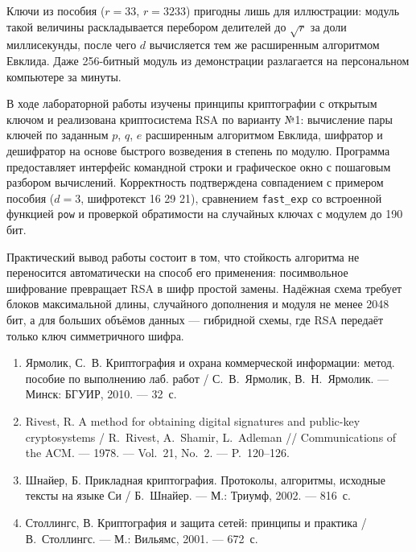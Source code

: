 \documentclass[14pt,a4paper]{extarticle}
\begin{document}
Ключи из пособия ($r = 33$, $r = 3233$) пригодны лишь для иллюстрации: модуль такой
величины раскладывается перебором делителей до $\sqrt{r}$ за доли миллисекунды, после
чего $d$ вычисляется тем же расширенным алгоритмом Евклида. Даже 256-битный модуль из
демонстрации разлагается на персональном компьютере за минуты.


В ходе лабораторной работы изучены принципы криптографии с открытым ключом и
реализована криптосистема RSA по варианту №1: вычисление пары ключей по заданным
$p$, $q$, $e$ расширенным алгоритмом Евклида, шифратор и дешифратор на основе
быстрого возведения в степень по модулю. Программа предоставляет интерфейс командной
строки и графическое окно с пошаговым разбором вычислений. Корректность подтверждена
совпадением с примером пособия ($d = 3$, шифротекст 16 29 21), сравнением
\texttt{fast\_exp} со встроенной функцией \texttt{pow} и проверкой обратимости на
случайных ключах с модулем до 190 бит.

Практический вывод работы состоит в том, что стойкость алгоритма не переносится
автоматически на способ его применения: посимвольное шифрование превращает RSA в шифр
простой замены. Надёжная схема требует блоков максимальной длины, случайного
дополнения и модуля не менее 2048 бит, а для больших объёмов данных --- гибридной
схемы, где RSA передаёт только ключ симметричного шифра.


\begin{enumerate}
\item Ярмолик, С.~В. Криптография и охрана коммерческой информации: метод. пособие по
выполнению лаб. работ / С.~В.~Ярмолик, В.~Н.~Ярмолик. --- Минск: БГУИР, 2010. --- 32~с.
\item Rivest, R. A method for obtaining digital signatures and public-key cryptosystems /
R.~Rivest, A.~Shamir, L.~Adleman // Communications of the ACM. --- 1978. --- Vol.~21,
No.~2. --- P.~120--126.
\item Шнайер, Б. Прикладная криптография. Протоколы, алгоритмы, исходные тексты на
языке Си / Б.~Шнайер. --- М.: Триумф, 2002. --- 816~с.
\item Столлингс, В. Криптография и защита сетей: принципы и практика /
В.~Столлингс. --- М.: Вильямс, 2001. --- 672~с.
\end{enumerate}
\end{document}
